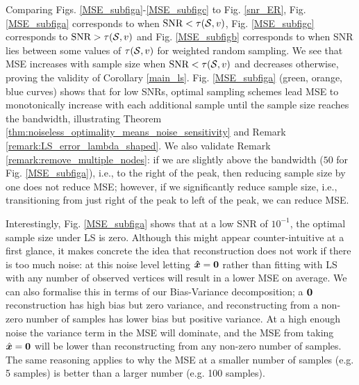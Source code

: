 Comparing Figs. \ref{MSE_subfiga}-\ref{MSE_subfigc} to Fig. \ref{snr_ER}, Fig. \ref{MSE_subfiga} corresponds to when $\text{SNR} < \tau(\mathcal{S},v)$, Fig. \ref{MSE_subfigc} corresponds to $\text{SNR} > \tau(\mathcal{S},v)$ and Fig. \ref{MSE_subfigb} corresponds to when SNR lies between some values of $\tau(\mathcal{S},v)$ for weighted random sampling.  
We see that MSE increases with sample size when $\text{SNR} < \tau(\mathcal{S},v)$ and decreases otherwise, proving the validity of Corollary \ref{main_ls}.
Fig. \ref{MSE_subfiga} (green, orange, blue curves) shows that for low SNRs, optimal sampling schemes  lead MSE to monotonically increase with each additional sample until the sample size reaches the bandwidth, illustrating Theorem \ref{thm:noiseless_optimality_means_noise_sensitivity} and Remark \ref{remark:LS_error_lambda_shaped}. We also validate Remark \ref{remark:remove_multiple_nodes}: if we are slightly above the bandwidth ($50$ for Fig. \ref{MSE_subfiga}), i.e., to the right of the peak, then reducing sample size by one does not reduce MSE; however, if we significantly reduce sample size, i.e., transitioning from just right of the peak to left of the peak, we can reduce MSE. %


Interestingly, Fig. \ref{MSE_subfiga} shows that at a low SNR of $10^{-1}$, the optimal sample size under LS is zero. Although this might appear counter-intuitive at a first glance, it makes concrete the idea that reconstruction does not work if there is too much noise: at this noise level letting $\bm{\hat{x}} = \bm{0}$ rather than fitting with LS with any number of observed vertices will result in a lower MSE on average. We can also formalise this in terms of our Bias-Variance decomposition; a $\bm{0}$ reconstruction has high bias but zero variance, and reconstructing from a non-zero number of samples has lower bias but positive variance. At a high enough noise the variance term in the MSE will dominate, and the MSE from taking $\hat{\bm{x}} = \bm{0}$ will be lower than reconstructing from any non-zero number of samples. The same reasoning applies to why the MSE at a smaller number of samples (e.g. 5 samples) is better than a larger number (e.g. 100 samples).


